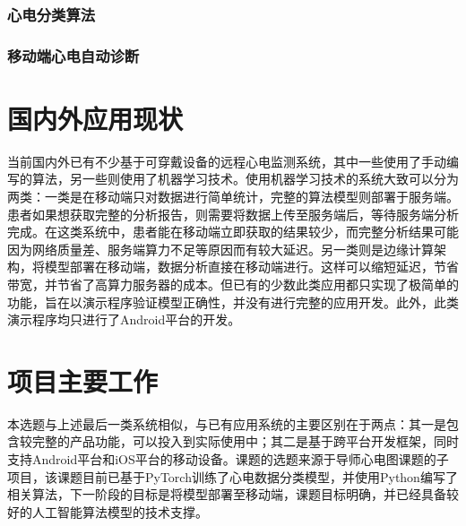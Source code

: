 \documentclass{ecnuthesis}
\begin{document}
    \subsubsection{心电分类算法}\label{subsubsec:classification}

    \subsubsection{移动端心电自动诊断}\label{subsubsec:mobile}


    \section{国内外应用现状}\label{sec:status}
    当前国内外已有不少基于可穿戴设备的远程心电监测系统，其中一些使用了手动编写的算法\cite{zhengJiyukechuandaishebeideyidongjianhuAPP2019,wuYidongxindianjiancexitongdeyanjiuyushixian2018,chenYidongxindianxinxijianhuxitongjixindianjiancesuanfadeyanjiu2018,heJiyuyidongpingtaidexindianjianceyiliaoxitongdeshixian2017,gradlRealtimeECGMonitoring2012,wenRealtimeECGTelemonitoring2008}，另一些则使用了机器学习技术。使用机器学习技术的系统大致可以分为两类：一类是在移动端只对数据进行简单统计，完整的算法模型则部署于服务端\cite{wangJiyushenduxuexideyidongyuanchengxindianjiancexitongshejiyushixian2020,singhSmartECGMonitoring2022}。患者如果想获取完整的分析报告，则需要将数据上传至服务端后，等待服务端分析完成。在这类系统中，患者能在移动端立即获取的结果较少，而完整分析结果可能因为网络质量差、服务端算力不足等原因而有较大延迟。另一类则是边缘计算架构，将模型部署在移动端，数据分析直接在移动端进行\cite{chenJiyushenduxuexidexindianfenximoxingdeshejiyuyouhua2021,liuJiyuyidongzhongduanfenxidekechuandairouxingxindianjiancexitong2021,wangEnablingSmartPersonalized2014,jinPredictingCardiovascularDisease2009}。这样可以缩短延迟，节省带宽，并节省了高算力服务器的成本。但已有的少数此类应用都只实现了极简单的功能，旨在以演示程序验证模型正确性，并没有进行完整的应用开发。此外，此类演示程序均只进行了Android平台的开发。


    \section{项目主要工作}\label{sec:work}
    本选题与上述最后一类系统相似，与已有应用系统的主要区别在于两点：其一是包含较完整的产品功能，可以投入到实际使用中；其二是基于跨平台开发框架，同时支持Android平台和iOS平台的移动设备。课题的选题来源于导师心电图课题的子项目，该课题目前已基于PyTorch训练了心电数据分类模型，并使用Python编写了相关算法，下一阶段的目标是将模型部署至移动端，课题目标明确，并已经具备较好的人工智能算法模型的技术支撑。
\end{document}
